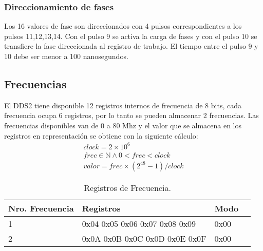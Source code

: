\subsubsection{Direccionamiento de fases}
Los 16 valores de fase son direccionados con 4 pulsos correspondientes a los 
pulsos 11,12,13,14. Con el pulso 9 se activa la carga de fases y con el pulso 10
se transfiere la fase direccionada al registro de trabajo.
El tiempo entre el pulso 9 y 10 debe ser menor a 100 nanosegundos.

\subsection{Frecuencias}

El DDS2 tiene disponible 12 registros internos de frecuencia de 8 bits, cada frecuencia ocupa 6 registros, 
por lo tanto se pueden almacenar 2 frecuencias.
Las frecuencias disponibles van de 0 a 80 Mhz y el valor que se almacena en los registros
en representaci\'on se obtiene con la siguiente c\'alculo:
\noindent
\begin{gather}
    clock = 2 \times 10^{6} \\
    frec \in \mathbb{N} \land 0 < frec < clock\\
    valor = frec \times (2^{48} -1 ) / clock
\end{gather}

\begin{table}[ht]
    \centering
    \begin{tabular}{|l|l|l|l|}
    \hline
    Nro. Frecuencia    & Registros       & Modo \\
    \hline
     1 & 0x04 0x05 0x06 0x07 0x08 0x09   & 0x00 \\
    \hline
     2 & 0x0A 0x0B 0x0C 0x0D 0x0E 0x0F   & 0x00 \\
    \hline
\end{tabular}
\caption{\label{tab:registros_frec}Registros de Frecuencia.}
\end{table}

